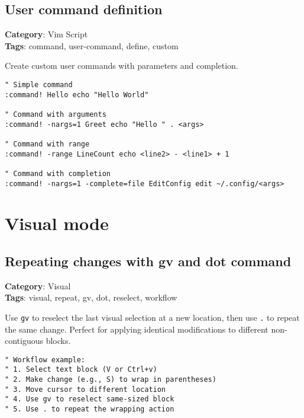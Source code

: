 {{{{{{{{{{{{{{{{{{\section{User command definition}

\textbf{Category}: Vim Script\\ \textbf{Tags}: command, user-command, define, custom
\vspace{0.5cm}

Create custom user commands with parameters and completion.

\begin{Exa*}{}
\begin{Verbatim}[fontsize=\footnotesize, breaklines, breakanywhere]
" Simple command
:command! Hello echo "Hello World"

" Command with arguments
:command! -nargs=1 Greet echo "Hello " . <args>

" Command with range
:command! -range LineCount echo <line2> - <line1> + 1

" Command with completion
:command! -nargs=1 -complete=file EditConfig edit ~/.config/<args>
\end{Verbatim}
\end{Exa*}

\chapter{Visual mode}
\section{Repeating changes with gv and dot command}

\textbf{Category}: Visual\\ \textbf{Tags}: visual, repeat, gv, dot, reselect, workflow
\vspace{0.5cm}

Use {\footnotesize \Verb§gv§} to reselect the last visual selection at a new location, then use {\footnotesize \Verb§.§} to repeat the same change. Perfect for applying identical modifications to different non-contiguous blocks.

\begin{Exa*}{}
\begin{Verbatim}[fontsize=\footnotesize, breaklines, breakanywhere]
" Workflow example:
" 1. Select text block (V or Ctrl+v)
" 2. Make change (e.g., S) to wrap in parentheses)
" 3. Move cursor to different location
" 4. Use gv to reselect same-sized block
" 5. Use . to repeat the wrapping action
\end{Verbatim}
\end{Exa*}

}}}}}}}}}}}}}}}}}}

